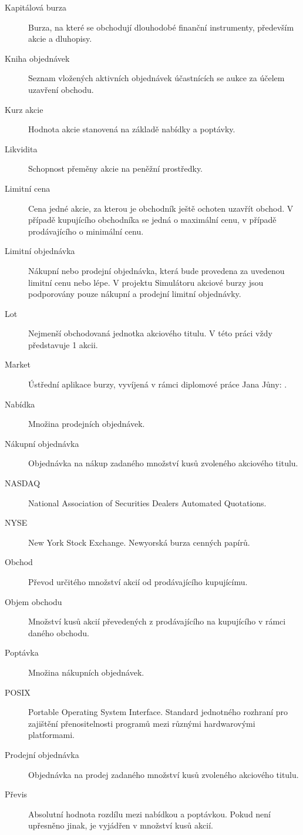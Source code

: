 \documentclass[thesis=M,czech]{FITthesis}[2012/06/26]
\begin{document}
\begin{description}
	\item[Kapitálová burza] Burza, na které se obchodují dlouhodobé finanční instrumenty, především akcie a dluhopisy.
	\item[Kniha objednávek] Seznam vložených aktivních objednávek účastnících se aukce za účelem uzavření obchodu.
	\item[Kurz akcie] Hodnota akcie stanovená na základě nabídky a poptávky.
	\item[Likvidita] Schopnost přeměny akcie na peněžní prostředky. 
	\item[Limitní cena] Cena jedné akcie, za kterou je obchodník ještě ochoten uzavřít obchod. 
			V případě kupujícího obchodníka se jedná o maximální cenu, v případě prodávajícího o minimální cenu.
	\item[Limitní objednávka] Nákupní nebo prodejní objednávka, která bude provedena za uvedenou limitní cenu nebo lépe. 
			V projektu Simulátoru akciové burzy jsou podporovány pouze nákupní a prodejní limitní objednávky.
	\item[Lot] Nejmenší obchodovaná jednotka akciového titulu. V této práci vždy představuje 1 akcii.
	\item[Market] Ústřední aplikace burzy, vyvíjená v rámci diplomové práce Jana Jůny: \cite{junadip}.
	\item[Nabídka] Množina prodejních objednávek. 
	\item[Nákupní objednávka] Objednávka na nákup zadaného množství kusů zvoleného akciového titulu.
	\item[NASDAQ] National Association of Securities Dealers Automated Quotations. 
	\item[NYSE] New York Stock Exchange. Newyorská burza cenných papírů.
	\item[Obchod] Převod určitého množství akcií od prodávajícího kupujícímu.
	\item[Objem obchodu] Množství kusů akcií převedených z prodávajícího na kupujícího v rámci daného obchodu.
	\item[Poptávka] Množina nákupních objednávek.
	\item[POSIX] Portable Operating System Interface. Standard jednotného rozhraní pro zajištění přenositelnosti programů mezi různými hardwarovými platformami.
	\item[Prodejní objednávka] Objednávka na prodej zadaného množství kusů zvoleného akciového titulu.
	\item[Převis] Absolutní hodnota rozdílu mezi nabídkou a poptávkou. Pokud není upřesněno jinak, je vyjádřen v množství kusů akcií.

\end{description}
\end{document}
